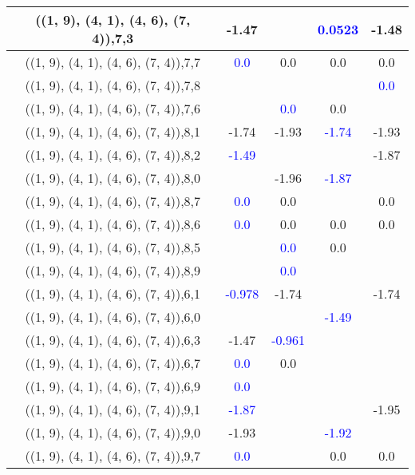 \documentclass{article}
\begin{document}
\begin{center}
\begin{longtable}{|c|c|c|c|c|}
        	\hline
        	((1, 9), (4, 1), (4, 6), (7, 4)),7,3&-1.47&& \textcolor{blue}{0.0523}&-1.48\\
        	\hline
        	((1, 9), (4, 1), (4, 6), (7, 4)),7,7& \textcolor{blue}{0.0}&0.0&0.0&0.0\\
        	\hline
        	((1, 9), (4, 1), (4, 6), (7, 4)),7,8&&&& \textcolor{blue}{0.0}\\
        	\hline
        	((1, 9), (4, 1), (4, 6), (7, 4)),7,6&& \textcolor{blue}{0.0}&0.0&\\
        	\hline
        	((1, 9), (4, 1), (4, 6), (7, 4)),8,1&-1.74&-1.93& \textcolor{blue}{-1.74}&-1.93\\
        	\hline
        	((1, 9), (4, 1), (4, 6), (7, 4)),8,2& \textcolor{blue}{-1.49}&&&-1.87\\
        	\hline
        	((1, 9), (4, 1), (4, 6), (7, 4)),8,0&&-1.96& \textcolor{blue}{-1.87}&\\
        	\hline
        	((1, 9), (4, 1), (4, 6), (7, 4)),8,7& \textcolor{blue}{0.0}&0.0&&0.0\\
        	\hline
        	((1, 9), (4, 1), (4, 6), (7, 4)),8,6& \textcolor{blue}{0.0}&0.0&0.0&0.0\\
        	\hline
        	((1, 9), (4, 1), (4, 6), (7, 4)),8,5&& \textcolor{blue}{0.0}&0.0&\\
        	\hline
        	((1, 9), (4, 1), (4, 6), (7, 4)),8,9&& \textcolor{blue}{0.0}&&\\
        	\hline
        	((1, 9), (4, 1), (4, 6), (7, 4)),6,1& \textcolor{blue}{-0.978}&-1.74&&-1.74\\
        	\hline
        	((1, 9), (4, 1), (4, 6), (7, 4)),6,0&&& \textcolor{blue}{-1.49}&\\
        	\hline
        	((1, 9), (4, 1), (4, 6), (7, 4)),6,3&-1.47& \textcolor{blue}{-0.961}&&\\
        	\hline
        	((1, 9), (4, 1), (4, 6), (7, 4)),6,7& \textcolor{blue}{0.0}&0.0&&\\
        	\hline
        	((1, 9), (4, 1), (4, 6), (7, 4)),6,9& \textcolor{blue}{0.0}&&&\\
        	\hline
        	((1, 9), (4, 1), (4, 6), (7, 4)),9,1& \textcolor{blue}{-1.87}&&&-1.95\\
        	\hline
        	((1, 9), (4, 1), (4, 6), (7, 4)),9,0&-1.93&& \textcolor{blue}{-1.92}&\\
        	\hline
        	((1, 9), (4, 1), (4, 6), (7, 4)),9,7& \textcolor{blue}{0.0}&&0.0&0.0\\
        	\hline

\end{longtable}
\end{center}
\end{document}
